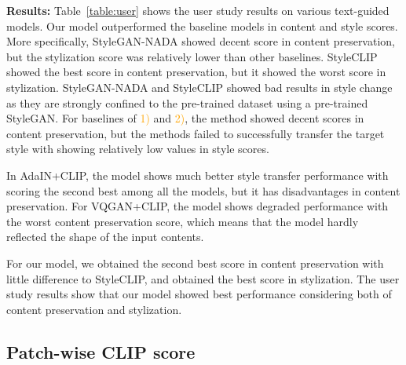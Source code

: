 \documentclass[10pt,twocolumn,letterpaper]{article}
\begin{document}
\noindent\textbf{Results:} 
Table~\ref{table:user} shows the user study results on various text-guided models. Our model outperformed the baseline models in content and style scores. More specifically, StyleGAN-NADA showed decent score in content preservation, but the stylization score was relatively lower than other baselines. StyleCLIP showed the best score in content preservation, but it showed the worst score in stylization. StyleGAN-NADA and StyleCLIP showed bad results in style change as they are strongly confined to the pre-trained dataset using a pre-trained StyleGAN.  For baselines of \textcolor{orange}{1)} and \textcolor{orange}{2)}, the method showed decent scores in content preservation, but the methods failed to successfully transfer the target style with showing relatively low values in style scores.

In AdaIN+CLIP, the model shows much better style transfer performance with scoring the second best among all the models, but it has disadvantages in content preservation. For VQGAN+CLIP, the model shows degraded performance with the worst content preservation score, which means that the model hardly reflected the shape of the input contents. 

For our model, we obtained the second best score in content preservation with little difference to StyleCLIP, and obtained the best score in stylization. The user study results show that our model showed best performance considering both of content preservation and stylization.

\subsection{Patch-wise CLIP score}
\end{document}
